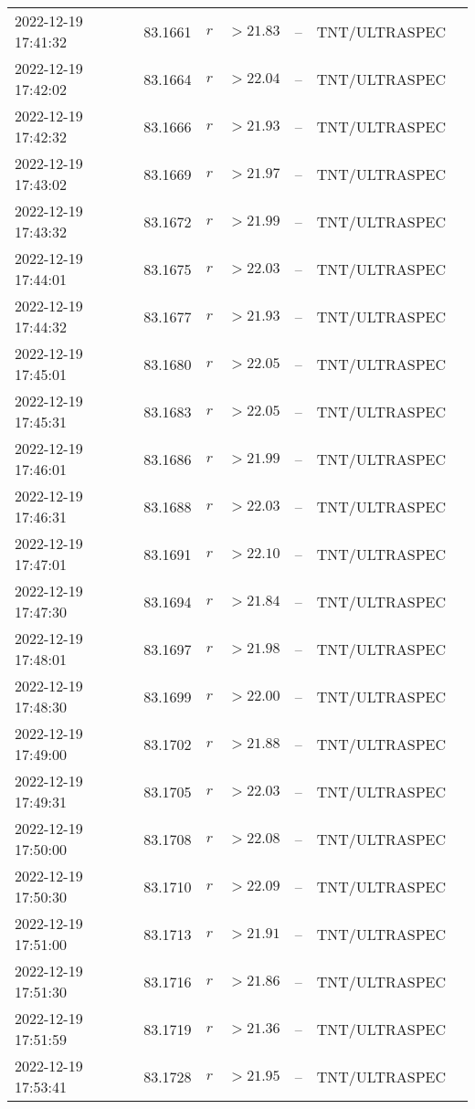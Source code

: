 \documentclass{nature_plusfigure}
\begin{document}
\begin{supplement}
\begin{center}
\begin{longtable}{lllllll}
2022-12-19 17:41:32 & 83.1661 & $r$ & $>21.83$ & -- & TNT/ULTRASPEC &  \\ 
2022-12-19 17:42:02 & 83.1664 & $r$ & $>22.04$ & -- & TNT/ULTRASPEC &  \\ 
2022-12-19 17:42:32 & 83.1666 & $r$ & $>21.93$ & -- & TNT/ULTRASPEC &  \\ 
2022-12-19 17:43:02 & 83.1669 & $r$ & $>21.97$ & -- & TNT/ULTRASPEC &  \\ 
2022-12-19 17:43:32 & 83.1672 & $r$ & $>21.99$ & -- & TNT/ULTRASPEC &  \\ 
2022-12-19 17:44:01 & 83.1675 & $r$ & $>22.03$ & -- & TNT/ULTRASPEC &  \\ 
2022-12-19 17:44:32 & 83.1677 & $r$ & $>21.93$ & -- & TNT/ULTRASPEC &  \\ 
2022-12-19 17:45:01 & 83.1680 & $r$ & $>22.05$ & -- & TNT/ULTRASPEC &  \\ 
2022-12-19 17:45:31 & 83.1683 & $r$ & $>22.05$ & -- & TNT/ULTRASPEC &  \\ 
2022-12-19 17:46:01 & 83.1686 & $r$ & $>21.99$ & -- & TNT/ULTRASPEC &  \\ 
2022-12-19 17:46:31 & 83.1688 & $r$ & $>22.03$ & -- & TNT/ULTRASPEC &  \\ 
2022-12-19 17:47:01 & 83.1691 & $r$ & $>22.10$ & -- & TNT/ULTRASPEC &  \\ 
2022-12-19 17:47:30 & 83.1694 & $r$ & $>21.84$ & -- & TNT/ULTRASPEC &  \\ 
2022-12-19 17:48:01 & 83.1697 & $r$ & $>21.98$ & -- & TNT/ULTRASPEC &  \\ 
2022-12-19 17:48:30 & 83.1699 & $r$ & $>22.00$ & -- & TNT/ULTRASPEC &  \\ 
2022-12-19 17:49:00 & 83.1702 & $r$ & $>21.88$ & -- & TNT/ULTRASPEC &  \\ 
2022-12-19 17:49:31 & 83.1705 & $r$ & $>22.03$ & -- & TNT/ULTRASPEC &  \\ 
2022-12-19 17:50:00 & 83.1708 & $r$ & $>22.08$ & -- & TNT/ULTRASPEC &  \\ 
2022-12-19 17:50:30 & 83.1710 & $r$ & $>22.09$ & -- & TNT/ULTRASPEC &  \\ 
2022-12-19 17:51:00 & 83.1713 & $r$ & $>21.91$ & -- & TNT/ULTRASPEC &  \\ 
2022-12-19 17:51:30 & 83.1716 & $r$ & $>21.86$ & -- & TNT/ULTRASPEC &  \\ 
2022-12-19 17:51:59 & 83.1719 & $r$ & $>21.36$ & -- & TNT/ULTRASPEC &  \\ 
2022-12-19 17:53:41 & 83.1728 & $r$ & $>21.95$ & -- & TNT/ULTRASPEC &  \\ 

\end{longtable}
\end{center}
\end{supplement}
\end{document}
